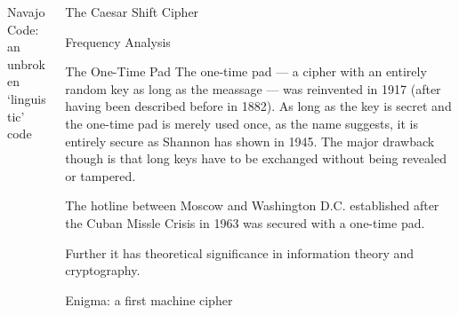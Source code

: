 \documentclass[final,hyperref={pdfpagelabels=false}]{beamer}
\begin{document}
\begin{frame}{}
\begin{columns}[t]
\begin{column}{.48\linewidth}
\begin{block}{Navajo Code: an unbroken `linguistic' code}
        \end{block}
      \end{column}
      \begin{column}{.48\linewidth}
        \begin{block}{The Caesar Shift Cipher}
        \end{block}

        \begin{block}{Frequency Analysis}
        \end{block}

        \begin{block}{The One-Time Pad}
          The one-time pad --- a cipher with an entirely random key as long as the meassage --- was reinvented in 1917 (after having been described before in 1882). As long as the key is secret and the one-time pad is merely used once, as the name suggests, it is entirely secure as Shannon has shown in 1945. The major drawback though is that long keys have to be exchanged without being revealed or tampered. \par
          The hotline between Moscow and Washington D.C. established after the Cuban Missle Crisis in 1963 was secured with a one-time pad. \par
          Further it has theoretical significance in information theory and cryptography.
        \end{block}
        \begin{block}{Enigma: a first machine cipher}
        \end{block}
      \end{column}
    \end{columns}
  \end{frame}
\end{document}
